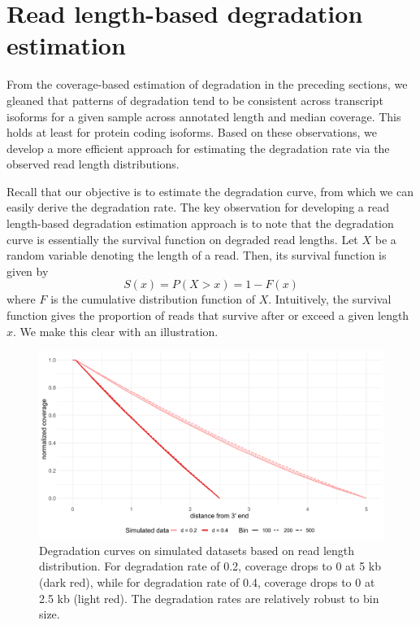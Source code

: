\section{Read length-based degradation estimation}\label{sec:rld}

From the coverage-based estimation of degradation in the preceding sections, we gleaned that patterns of degradation tend to be consistent across transcript isoforms for a given sample across annotated length and median coverage. This holds at least for protein coding isoforms. Based on these observations, we develop a more efficient approach for estimating the degradation rate via the observed read length distributions.

Recall that our objective is to estimate the degradation curve, from which we can easily derive the degradation rate. The key observation for developing a read length-based degradation estimation approach is to note that the degradation curve is essentially the survival function on degraded read lengths. Let $X$ be a random variable denoting the length of a read. Then, its survival function is given by 
\begin{equation}
    S(x)=P(X>x)=1-F(x)
\end{equation}
where $F$ is the cumulative distribution function of $X$. Intuitively, the survival function gives the proportion of reads that survive after or exceed a given length $x$. We make this clear with an illustration. 



\begin{figure}[H]
    \centering
    \includegraphics[width=\textwidth]{figures/sec-2-length-sim.png}
    \caption[Degradation curves on simulated datasets based on read length distribution]{Degradation curves on simulated datasets based on read length distribution. For degradation rate of 0.2, coverage drops to 0 at 5 kb (dark red), while for degradation rate of 0.4, coverage drops to 0 at 2.5 kb (light red). The degradation rates are relatively robust to bin size.}
    \label{fig:length-sim}
\end{figure}

